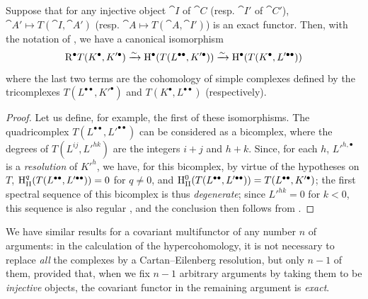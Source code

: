 \begin{proposition}[11.4.7]
\label{0.11.4.7}
Suppose that for any injective object $\cat{I}$ of $\cat{C}$ (resp. $\cat{I'}$ of $\cat{C}'$), $\cat{A'}\mapsto T(\cat{I}, \cat{A'})$ (resp. $\cat{A}\mapsto T(\cat{A}, \cat{I'})$) is an exact functor.
Then, with the notation of , we have a canonical isomorphism
\[
  \mathrm{R}^\bullet T(K^\bullet, K'^\bullet) \xrightarrow{\sim} \mathrm{H}^\bullet(T(L^{\bullet\bullet}, K'^\bullet)) \xrightarrow{\sim} \mathrm{H}^\bullet(T(K^\bullet, L'^{\bullet\bullet})) 
\]
where the last two terms are the cohomology of simple complexes defined by the tricomplexes $T(L^{\bullet\bullet}, K'^\bullet)$ and $T(K^\bullet, L^{\bullet\bullet})$ (respectively).
\end{proposition}

\begin{proof}
Let us define, for example, the first of these isomorphisms.
The quadricomplex $T(L^{\bullet\bullet}, L'^{\bullet\bullet})$ can be considered as a bicomplex, where the degrees of $T(L^{ij}, L'^{hk})$ are the integers $i+j$ and $h+k$.
Since, for each $h$, ${L'}^{h,\bullet}$ is a \emph{resolution} of ${K'}^h$, we have, for this bicomplex, by virtue of the hypotheses on $T$, $\mathrm{H}_\mathrm{II}^q(T(L^{\bullet\bullet}, L'^{\bullet\bullet}))=0$ for $q\neq 0$, and $\mathrm{H}_\mathrm{II}^0(T(L^{\bullet\bullet}, L'^{\bullet\bullet})) = T(L^{\bullet\bullet}, K'^\bullet)$;
the first spectral sequence of this bicomplex is thus \emph{degenerate};
since $L'^{hk}=0$ for $k<0$, this sequence is also regular , and the conclusion then follows from .
\end{proof}

We have similar results for a covariant multifunctor of any number $n$ of arguments: in the calculation of the hypercohomology, it is not necessary to replace \emph{all} the complexes 
by a Cartan--Eilenberg resolution, but only $n-1$ of them, provided that, when we fix $n-1$ arbitrary arguments by taking them to be \emph{injective} objects, the covariant functor in the remaining argument is \emph{exact}.


